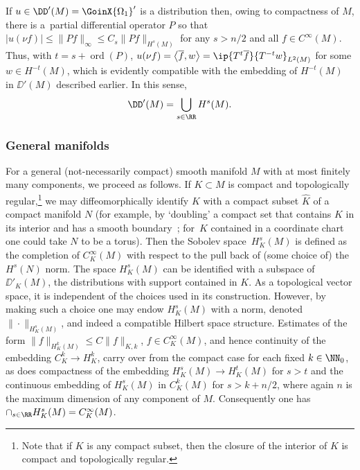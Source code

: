  If $u\in \DD'(M)= \GoinX{\Omega_1}'$ is a distribution then, owing to compactness of $M$, there is a~partial differential operator $P$ so that $|u(\nu f)|\le \|Pf\|_\infty \le C_s \|Pf\|_{H^s(M)}$ for any $s>n/2$ and all $f\in C^\infty(M)$. Thus, with $t=s+\operatorname{ord} (P)$, $u(\nu f)= \big\langle \overline{f},w\big\rangle= \ip{T^t \overline{f}}{T^{-t}w}_{L^2(M)}$ for some $w\in H^{-t}(M)$, which is evidently compatible with the embedding of $H^{-t}(M)$ in $\DD'(M)$
 described earlier. In this sense,
 \begin{equation*}
 	\DD'(M) = \bigcup_{s\in\RR} H^{s}(M).
 \end{equation*}

 \subsubsection{General manifolds}

 For a general (not-necessarily compact) smooth manifold $M$ with at most finitely many components,
 we proceed as follows. If $K\subset M$ is compact and topologically regular,\footnote{Note that if $K$ is any compact subset, then the closure of the interior of $K$ is compact and topologically regular.} we may
 diffeomorphically identify $K$ with a compact subset $\hat{K}$ of a compact manifold $N$ (for example, by `doubling' a compact set that contains $K$ in its interior and has a smooth boundary~\cite{BaerWafo:2015}; for~$K$ contained in a coordinate chart one could take $N$ to be a torus). Then the Sobolev space~$H^s_K(M)$ is defined as the completion of
 $C^\infty_K(M)$ with respect to the pull back of (some choice of) the~$H^s(N)$ norm. The space $H^s_K(M)$ can be identified with a subspace of $\DD'_K(M)$, the distributions with support contained in $K$. As a topological vector space, it is independent of the choices used in its construction. However, by making such a choice one may
 endow $H^s_K(M)$ with a norm, denoted $\|\cdot\|_{H^s_K(M)}$, and indeed a compatible Hilbert space structure.
 Estimates of the form
 $\|f\|_{H^k_K(M)}\le C\|f\|_{K,k}$, $f\in C^\infty_K(M)$, and hence continuity of
 the embedding $C^k_K\to H^k_K$, carry over from the compact case for each fixed $k\in\NN_0$, as does compactness of the embedding $H^{s}_K(M)\to H^{t}_K(M)$ for $s>t$
 and the continuous embedding of $H^s_K(M)$ in $C^k_K(M)$ for $s>k+n/2$,
 where again $n$ is the maximum dimension of any component of $M$.
 Consequently one has $\cap_{s\in\RR} H^s_K(M)=C^\infty_K(M)$.

